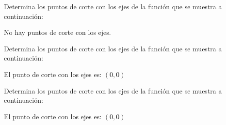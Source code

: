 \vspace{1cm}

\begin{ex}
	Determina los puntos de corte con los ejes de la función que se muestra a continuación:\\
	\begin{sol}
		No hay puntos de corte con los ejes.
	\end{sol}
\end{ex}

\vspace{1cm}

\begin{ex}
	Determina los puntos de corte con los ejes de la función que se muestra a continuación:\\
	\begin{sol}
		El punto de corte con los ejes es: $(0,0)$
	\end{sol}
\end{ex}

\vspace{1cm}

\begin{ex}
	Determina los puntos de corte con los ejes de la función que se muestra a continuación:\\
	\begin{sol}
		El punto de corte con los ejes es: $(0,0)$
	\end{sol}
\end{ex}
